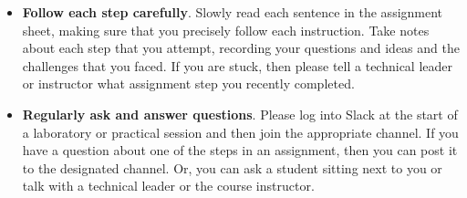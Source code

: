 \documentclass[11pt]{article}
\newcommand{\command}[1]{``\lstinline{#1}''}
\begin{document}
\begin{itemize}
  \setlength{\itemsep}{0pt}

\item {\bf Follow each step carefully}. Slowly read each sentence in the
  assignment sheet, making sure that you precisely follow each instruction. Take
  notes about each step that you attempt, recording your questions and ideas and
  the challenges that you faced. If you are stuck, then please tell a technical
  leader or instructor what assignment step you recently completed.

\item {\bf Regularly ask and answer questions}. Please log into Slack at the
  start of a laboratory or practical session and then join the appropriate
  channel. If you have a question about one of the steps in an assignment, then
  you can post it to the designated channel. Or, you can ask a student sitting
  next to you or talk with a technical leader or the course instructor.





\end{itemize}
\end{document}
